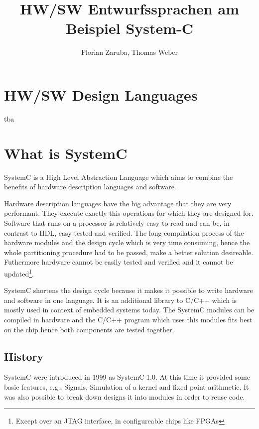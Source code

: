 \documentclass{article}
\begin{document}
	\title{HW/SW Entwurfssprachen am Beispiel System-C}
	\author{Florian Zaruba, Thomas Weber}

	\maketitle


	\section{HW/SW Design Languages}
	tba
	\section{What is SystemC}
	SystemC is a High Level Abstraction Language which aims to combine the benefits of hardware description languages and software.
	
	Hardware description languages have the big advantage that they are very performant.
	They execute exactly this operations for which they are designed for.	
	Software that runs on a processor is relatively easy to read and can be, in contrast to HDL, easy  tested and verified.	
	The long compilation process of the hardware modules and the design cycle which is very time consuming, hence the whole partitioning procedure had to be passed, make a better solution desireable.
	Futhermore hardware cannot be easily tested and verified and it cannot be updated\footnote{Except over an JTAG interface, in configureable chips like FPGAs}.
	
	SystemC shortens the design cycle because it makes it possible to write hardware and software in one language.
	It is an additional library to C/C++ which is mostly used in context of embedded systems today.
	The SystemC modules can be compiled in hardware and the C/C++ program which uses this modules fits best on the chip hence both components are tested together.
	  \subsection{History}
	    SystemC were introduced in 1999 as SystemC 1.0. At this time it provided some basic features, e.g., Signals, Simulation of a kernel and fixed point arithmetic.
	    It was also possible to break down designs it into modules in order to reuse code.
	    
\end{document}
